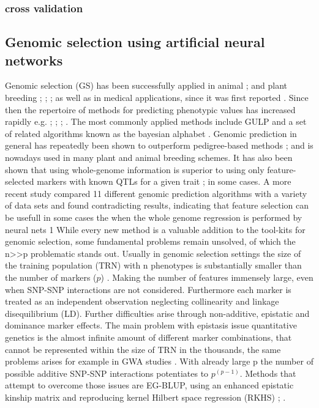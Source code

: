 \subsubsection{cross validation}



\subsection{Genomic selection using artificial neural networks }
Genomic selection (GS) has been successfully applied in animal \cite{gianola2015one}; \cite{hayes2010genome}
and plant breeding \cite{crossa2010}; \cite{desta2014genomic}; \cite{heffner2010plant};
\cite{crossa2017} as well as in medical applications, since it was first reported
\cite{hayes2001}. Since then the repertoire of methods for predicting phenotypic values has increased rapidly
e.g. \cite{dlc2009}; \cite{habier2011}; \cite{gianola2013}; \cite{crossa2017}. The most commonly applied
methods include GULP and a set of related algorithms known as the bayesian alphabet
\cite{gianola2009}. Genomic prediction in general has repeatedly been shown to outperform pedigree-based
methods \cite{crossa2010}; \cite{albrecht2011} and is nowadays used in many plant and animal breeding
schemes. It has also been shown that using whole-genome information is superior to using only feature-selected
markers with known QTLs for a given trait \cite{bernardo2007}; \cite{heffner2011} in some cases. A more recent
study \cite{azodi2019} compared 11 different genomic prediction algorithms with a variety of data sets and
found contradicting results, indicating that feature selection can be usefull in some cases the when the whole
genome regression is performed by neural nets 1 While every new method is a valuable addition to the tool-kits
for genomic selection, some fundamental problems remain unsolved, of which the n>>p problematic stands
out. Usually in genomic selection settings the size of the training population (TRN) with n phenotypes is
substantially smaller than the number of markers ($p$) \cite{fan2014challenges}. Making the number of features
immensely large, even when SNP-SNP interactions are not considered. Furthermore each marker is treated as an
independent observation neglecting collinearity and linkage disequilibrium (LD). Further difficulties arise
through non-additive, epistatic and dominance marker effects. The main problem with epistasis issue
quantitative genetics is the almost infinite amount of different marker combinations, that cannot be
represented within the size of TRN in the thousands, the same problems arises for example in GWA studies
\cite{korte2013advantages}. With already large p the number of possible additive SNP-SNP interactions
potentiates to $p^{(p-1)}$. Methods that attempt to overcome those issues are EG-BLUP, using an enhanced
epistatic kinship matrix and reproducing kernel Hilbert space regression (RKHS) \cite{jiang2015};
\cite{martini2017genomic}.


